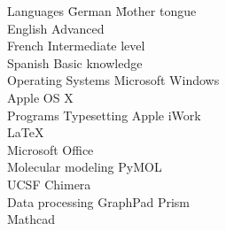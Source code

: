 \normalsize
\begin{tabbing}
Languages \hspace{2.2cm} \= German \hspace{2.5cm} \= Mother tongue \\[0.1cm]
\> English \> Advanced \\ [0.1cm]
\> French \> Intermediate level \\[0.1cm]
\> Spanish \> Basic knowledge \\ [0.3cm]
Operating Systems \> Microsoft Windows \\[0.1cm]
\> Apple OS X \\ [0.3cm]

Programs \> Typesetting \> Apple iWork \\[0.1cm] 
\> \> \LaTeX \\[0.1cm]
\> \> Microsoft Office \\[0.1cm]
\> Molecular modeling \> PyMOL \\
\> \> UCSF Chimera \\ [0.1cm]
\> Data processing \> GraphPad Prism \\
\> \> Mathcad 
\end{tabbing}